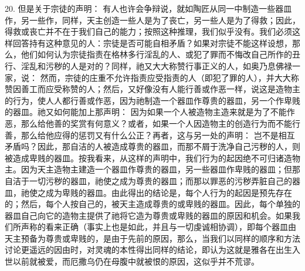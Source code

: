 20. 但是关于宗徒的声明： 有人也许会争辩说，就如陶匠从同一中制造一些器皿作，另一些作，同样，天主创造一些人是为了丧亡，另一些人是为了得救；因此，得救或丧亡并不在于我们自己的能力；按照这种推理，我们似乎没有。我们必须这样回答持有这种意见的人：宗徒是否可能自相矛盾？如果对宗徒不能这样设想，那么，他们如何认为宗徒指责在格林多行淫乱的人、或犯了罪而不悔改自己所作的丑行、淫乱和污秽的人是对的？同样，祂又大大称赞行事正义的人，如奥乃息佛禄一家，说： 然而，宗徒的庄重不允许指责应受指责的人（即犯了罪的人），并大大称赞因善工而应受称赞的人；然后，又好像没有人能行善或作恶一样，说这是造物主的行为，使人人都行善或作恶，因为祂制造一个器皿作尊贵的器皿，另一个作卑贱的器皿。祂又如何能加上那声明： 因为如果一个人被造物主造来就是为了不能作恶，那么给他善的奖赏有何意义？或者，如果一个人因造物主的创造行为而不能行善，那么给他应得的惩罚又有什么公正？再者，这与另一处的声明： 岂不是相互矛盾吗？因此，那自洁的人被造成尊贵的器皿，而那不屑于洗净自己污秽的人，则被造成卑贱的器皿。按我看来，从这样的声明中，我们行为的起因绝不可归诸造物主。因为天主造物主建造一个器皿作尊贵的器皿，另一些器皿作卑贱的器皿；但那自洁于一切污秽的器皿，祂使之成为尊贵的器皿；而那以罪恶的污秽弄脏自己的器皿，祂使之成为卑贱的器皿。由此得出的结论是，每个人行为的起因是预先存在的；然后，每个人按自己的，被天主造成尊贵的或卑贱的器皿。因此，每个单独的器皿自己向它的造物主提供了祂将它造为尊贵或卑贱的器皿的原因和机会。如果我们所声称的看来正确（事实上也是如此，并且与一切虔诚相协调），即每个器皿由天主预备为尊贵或卑贱的，是由于先前的原因，那么，当我们以同样的顺序和方法讨论更遥远的因由时，对灵魂的本性得出同样的结论，即认为这就是雅各在出生入世以前就被爱，而厄撒乌仍在母腹中就被恨的原因，这似乎并不荒谬。\par

